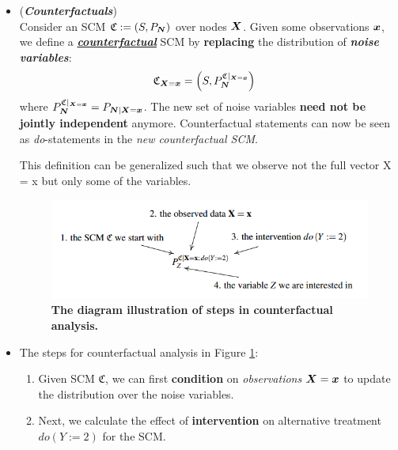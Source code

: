 \documentclass[11pt]{article}
\begin{document}
\begin{itemize}
\item \begin{definition} (\textbf{\emph{Counterfactuals}})  \citep{peters2017elements} \\
Consider an SCM $\mathfrak{C} := (S, P_{\boldsymbol{N}})$ over nodes $\boldsymbol{X}$. Given some observations $\boldsymbol{x}$, we define a \underline{\textbf{\emph{counterfactual}}} SCM by \textbf{replacing} the distribution of \emph{\textbf{noise variables}}:
\begin{align*}
\mathfrak{C}_{\boldsymbol{X} = \boldsymbol{x}} &= \left(S, P_{\boldsymbol{N}}^{\mathfrak{C}|_{\boldsymbol{X} = \boldsymbol{x}}}\right)
\end{align*}
where $P_{\boldsymbol{N}}^{\mathfrak{C}|_{\boldsymbol{X} = \boldsymbol{x}}} = P_{\boldsymbol{N} | \boldsymbol{X} = \boldsymbol{x}}$. The new set of noise variables \textbf{need not be jointly independent} anymore. Counterfactual statements can now be seen as \emph{do}-statements in the \emph{new counterfactual SCM}.
\end{definition} This definition can be generalized such that we observe not the full vector X = x
but only some of the variables. 


\begin{figure}
\begin{minipage}[t]{1\linewidth}
  \centering
  \centerline{\includegraphics[scale = 0.6]{counterfactual_construction.png}}
\end{minipage}
\caption{\footnotesize{\textbf{The diagram illustration of steps in counterfactual analysis.  \citep{peters2017elements}}}}
\label{fig: counterfactual_construction}
\end{figure}

\item The steps for counterfactual analysis in Figure \ref{fig: counterfactual_construction}:
\begin{enumerate}
\item Given SCM $\mathfrak{C}$, we can first \textbf{condition} on \emph{observations} $\boldsymbol{X} = \boldsymbol{x}$ to update the distribution over the noise variables.

\item Next, we calculate the effect of \textbf{intervention} on alternative treatment $do(Y := 2)$ for the SCM. 


\end{enumerate}
\end{itemize}
\end{document}
